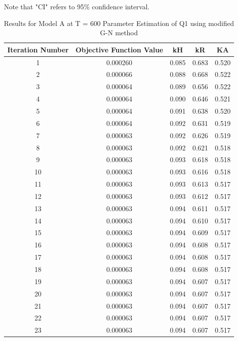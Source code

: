 \documentclass[a4paper,12pt]{article} %
\begin{document}
Note that "CI" refers to 95\% confidence interval.
\begin{table}[ht]
\caption{Results for Model A at T = 600 Parameter Estimation of Q1 using modified G-N method}
\centering
\begin{tabular}{|c|c|c|c|c|}
    \hline
    Iteration Number & Objective Function Value & kH & kR & KA \\
    \hline
    1 & 0.000260 & 0.085 & 0.683 & 0.520 \\
2 & 0.000066 & 0.088 & 0.668 & 0.522 \\
3 & 0.000064 & 0.089 & 0.656 & 0.522 \\
4 & 0.000064 & 0.090 & 0.646 & 0.521 \\
5 & 0.000064 & 0.091 & 0.638 & 0.520 \\
6 & 0.000064 & 0.092 & 0.631 & 0.519 \\
7 & 0.000063 & 0.092 & 0.626 & 0.519 \\
8 & 0.000063 & 0.092 & 0.621 & 0.518 \\
9 & 0.000063 & 0.093 & 0.618 & 0.518 \\
10 & 0.000063 & 0.093 & 0.616 & 0.518 \\
11 & 0.000063 & 0.093 & 0.613 & 0.517 \\
12 & 0.000063 & 0.093 & 0.612 & 0.517 \\
13 & 0.000063 & 0.094 & 0.611 & 0.517 \\
14 & 0.000063 & 0.094 & 0.610 & 0.517 \\
15 & 0.000063 & 0.094 & 0.609 & 0.517 \\
16 & 0.000063 & 0.094 & 0.608 & 0.517 \\
17 & 0.000063 & 0.094 & 0.608 & 0.517 \\
18 & 0.000063 & 0.094 & 0.608 & 0.517 \\
19 & 0.000063 & 0.094 & 0.607 & 0.517 \\
20 & 0.000063 & 0.094 & 0.607 & 0.517 \\
21 & 0.000063 & 0.094 & 0.607 & 0.517 \\
22 & 0.000063 & 0.094 & 0.607 & 0.517 \\
23 & 0.000063 & 0.094 & 0.607 & 0.517 \\
    \hline
\end{tabular}
\end{table}
\end{document}
